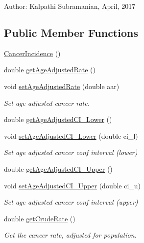 Author\+: Kalpathi Subramanian, April, 2017 \subsection*{Public Member Functions}
\begin{DoxyCompactItemize}
\item 
\hyperlink{classbridges_1_1data__src__dependent_1_1_cancer_incidence_a92db1eb4292c77f07619019587caf5cc}{Cancer\+Incidence} ()
\item 
double \hyperlink{classbridges_1_1data__src__dependent_1_1_cancer_incidence_a87bc1cbc5a72eb9b4df5ff7ab4843ae8}{get\+Age\+Adjusted\+Rate} ()
\item 
void \hyperlink{classbridges_1_1data__src__dependent_1_1_cancer_incidence_a26c2d63e8465bcfdab047129312b4897}{set\+Age\+Adjusted\+Rate} (double aar)
\begin{DoxyCompactList}\small\item\em Set age adjusted cancer rate. \end{DoxyCompactList}\item 
double \hyperlink{classbridges_1_1data__src__dependent_1_1_cancer_incidence_a7e5dab6d140f2a8e162c5d5c514c74c1}{get\+Age\+Adjusted\+C\+I\+\_\+\+Lower} ()
\item 
void \hyperlink{classbridges_1_1data__src__dependent_1_1_cancer_incidence_a4cd8ce7c68f00d2cd15928764cc32c09}{set\+Age\+Adjusted\+C\+I\+\_\+\+Lower} (double ci\+\_\+l)
\begin{DoxyCompactList}\small\item\em Set age adjusted cancer conf interval (lower) \end{DoxyCompactList}\item 
double \hyperlink{classbridges_1_1data__src__dependent_1_1_cancer_incidence_ae7b71d91c3acae9fce3536f6a9d8362b}{get\+Age\+Adjusted\+C\+I\+\_\+\+Upper} ()
\item 
void \hyperlink{classbridges_1_1data__src__dependent_1_1_cancer_incidence_aeb386486bfbd96ba9ab689b7d95d4522}{set\+Age\+Adjusted\+C\+I\+\_\+\+Upper} (double ci\+\_\+u)
\begin{DoxyCompactList}\small\item\em Set age adjusted cancer conf interval (upper) \end{DoxyCompactList}\item 
double \hyperlink{classbridges_1_1data__src__dependent_1_1_cancer_incidence_afc2ddb3099dffc46371ad7188278501d}{get\+Crude\+Rate} ()
\begin{DoxyCompactList}\small\item\em Get the cancer rate, adjusted for population. \end{DoxyCompactList}\item 

\end{DoxyCompactItemize}
